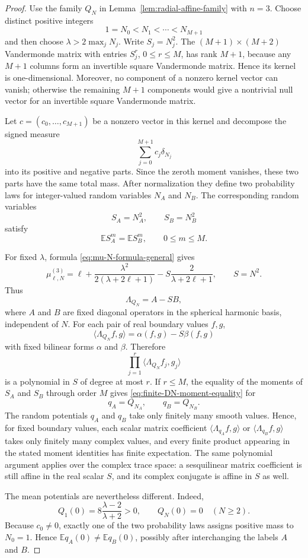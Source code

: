 \documentclass[11pt]{article}
\newcommand{\E}{\mathbb E}
\newcommand{\la}{\langle}
\newcommand{\ra}{\rangle}
\theoremstyle{plain}
\theoremstyle{definition}
\theoremstyle{remark}
\begin{document}
\begin{proof}
Use the family $Q_N$ in Lemma~\ref{lem:radial-affine-family} with $n=3$.  Choose distinct positive integers
\[
  1=N_0<N_1<\cdots<N_{M+1}
\]
and then choose $\lambda>2\max_jN_j$.  Write $S_j=N_j^2$.  The $(M+1)\times(M+2)$ Vandermonde matrix with entries $S_j^r$, $0\le r\le M$, has rank $M+1$, because any $M+1$ columns form an invertible square Vandermonde matrix.  Hence its kernel is one-dimensional.  Moreover, no component of a nonzero kernel vector can vanish; otherwise the remaining $M+1$ components would give a nontrivial null vector for an invertible square Vandermonde matrix.

Let $c=(c_0,\dots,c_{M+1})$ be a nonzero vector in this kernel and decompose the signed measure
\[
  \sum_{j=0}^{M+1}c_j\delta_{N_j}
\]
into its positive and negative parts.  Since the zeroth moment vanishes, these two parts have the same total mass.  After normalization they define two probability laws for integer-valued random variables $N_A$ and $N_B$.  The corresponding random variables
\[
  S_A=N_A^2,
  \qquad
  S_B=N_B^2
\]
satisfy
\[
  \E S_A^m=\E S_B^m,
  \qquad 0\le m\le M.
\]

For fixed $\lambda$, formula \eqref{eq:mu-N-formula-general} gives
\[
  \mu_{\ell,N}^{(3)}
  =\ell+\frac{\lambda^2}{2(\lambda+2\ell+1)}
   -S\frac{2}{\lambda+2\ell+1},
  \qquad S=N^2.
\]
Thus
\[
  \Lambda_{Q_N}=A-SB,
\]
where $A$ and $B$ are fixed diagonal operators in the spherical harmonic basis, independent of $N$.  For each pair of real boundary values $f,g$,
\[
  \la\Lambda_{Q_N}f,g\ra
  =\alpha(f,g)-S\beta(f,g)
\]
with fixed bilinear forms $\alpha$ and $\beta$.  Therefore
\[
  \prod_{j=1}^r\la\Lambda_{Q_N}f_j,g_j\ra
\]
is a polynomial in $S$ of degree at most $r$.  If $r\le M$, the equality of the moments of $S_A$ and $S_B$ through order $M$ gives \eqref{eq:finite-DN-moment-equality} for
\[
  q_A=Q_{N_A},
  \qquad
  q_B=Q_{N_B}.
\]
The random potentials $q_A$ and $q_B$ take only finitely many smooth values.  Hence, for fixed boundary values, each scalar matrix coefficient $\la\Lambda_{q_A}f,g\ra$ or $\la\Lambda_{q_B}f,g\ra$ takes only finitely many complex values, and every finite product appearing in the stated moment identities has finite expectation.  The same polynomial argument applies over the complex trace space: a sesquilinear matrix coefficient is still affine in the real scalar $S$, and its complex conjugate is affine in $S$ as well.

The mean potentials are nevertheless different.  Indeed,
\[
  Q_1(0)=8\frac{\lambda-2}{\lambda+2}>0,
  \qquad
  Q_N(0)=0\quad(N\ge2).
\]
Because $c_0\ne0$, exactly one of the two probability laws assigns positive mass to $N_0=1$.  Hence $\E q_A(0)\ne\E q_B(0)$, possibly after interchanging the labels $A$ and $B$.
\end{proof}
\end{document}
